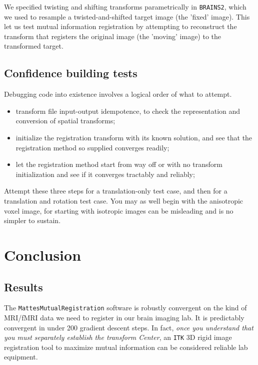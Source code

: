 \documentclass [10pt,twocolumn,twoside,final,letterpaper]{report}
\newcommand{\bcode}{\texttt}
\newcommand{\brainstwoprog}{\bcode{BRAINS2}}
\newcommand{\miregprog}{\bcode{MattesMutualRegistration}}
\begin{document}
We specified twisting and shifting transforms parametrically in \brainstwoprog{},
which we used to resample a twisted-and-shifted target image (the 'fixed' image).
This let us test mutual information registration by attempting to reconstruct 
the transform that registers the original image (the 'moving' image) to the transformed target.

\section{Confidence building tests} \label{sec:confidence}
Debugging code into existence involves a logical order of what to attempt.
\begin{itemize}
\item transform file input-output idempotence, 
to check the representation and conversion of spatial transforms;
\item initialize the registration transform with its known solution, 
and see that the registration method so supplied converges readily;
\item let the registration method start from way off or with no transform initialization 
and see if it converges tractably and reliably;
\end{itemize}
Attempt these three steps for a translation-only test case,
and then for a translation and rotation test case.
You may as well begin with the anisotropic voxel image,
for starting with isotropic images can be misleading and is no simpler to sustain.


\chapter{Conclusion} \label{sec:conclusion}

\section{Results} \label{sec:results}
The \miregprog{} software is robustly convergent on the
kind of MRI/fMRI data we need to register in our brain imaging lab.
It is predictably convergent in under 200 gradient descent steps.
In fact, \emph{once you understand that you must separately establish
the transform Center},
an \bcode{ITK} 3D rigid image registration tool to maximize mutual information
can be considered reliable lab equipment.
\end{document}
